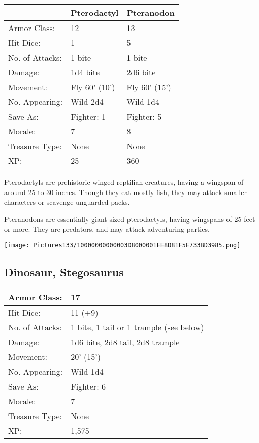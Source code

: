 \documentclass[a4paper,twoside,openany,10pt]{book}
\begin{document}
\begin{multicols}{2}
\begin{tabularx}{0.48\textwidth}{lXX}
& Pterodactyl & Pteranodon \\\hline
Armor Class: & 12 & 13 \\\hline
Hit Dice: & 1 & 5 \\\hline
No. of Attacks: & 1 bite & 1 bite \\\hline
Damage: & 1d4 bite & 2d6 bite \\\hline
Movement: & Fly 60' (10') & Fly
60' (15') \\\hline
No. Appearing: & Wild 2d4 & Wild 1d4 \\\hline
Save As: & Fighter: 1 & Fighter: 5 \\\hline
Morale: & 7 & 8 \\\hline
Treasure Type: & None & None \\\hline
XP: & 25 & 360 \\\hline
\end{tabularx}\medskip

Pterodactyls are prehistoric winged reptilian creatures, having a wingspan of around 25 to 30 inches. Though they eat mostly fish, they may attack smaller characters or scavenge unguarded packs.

Pteranodons are essentially giant-sized pterodactyls, having wingspans of 25 feet or more. They are predators, and may attack adventuring parties.

\begin{center}
	\texttt{[image: Pictures133/10000000000003D8000001EE8D81F5E733BD3985.png]}
\end{center}

\subsection*{Dinosaur, Stegosaurus}\label{dinosaur-stegosaurus}

\begin{tabularx}{0.48\textwidth}{@{}lX@{}}
Armor Class: & 17 \\\hline
Hit Dice: & 11 (+9) \\\hline
No. of Attacks: & 1 bite, 1 tail or 1 trample (see below) \\\hline
Damage: & 1d6 bite, 2d8 tail, 2d8 trample \\\hline
Movement: & 20' (15') \\\hline
No. Appearing: & Wild 1d4 \\\hline
Save As: & Fighter: 6 \\\hline
Morale: & 7 \\\hline
Treasure Type: & None \\\hline
XP: & 1,575 \\\hline
\end{tabularx}\medskip


\end{multicols}
\end{document}
